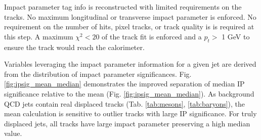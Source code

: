 Impact parameter tag info is reconstructed with limited requirements on the tracks. No maximum longitudinal or transverse impact parameter
is enforced. No requirement on the number of hits, pixel tracks, or track quality is is required at this step. A maximum $\chi^2 < 20$ of 
the track fit is enforced and a $p_{t}>$ 1 GeV to ensure the track would reach the calorimeter. 


Variables leveraging the impact parameter information for a given jet are derived from the distribution of impact parameter significances. 
Fig. \ref{fig:ipsig_mean_median} demonstrates the improved  separation of median IP significance relative
 to the mean (Fig. \ref{fig:ipsig_mean_median}). 
As background QCD jets contain real displaced tracks (Tab. \ref{tab:mesons}, \ref{tab:baryons}), the mean calculation is sensitive
 to outlier tracks with large IP significance. For truly displaced jets, all tracks have large impact parameter preserving 
a high median value. 

